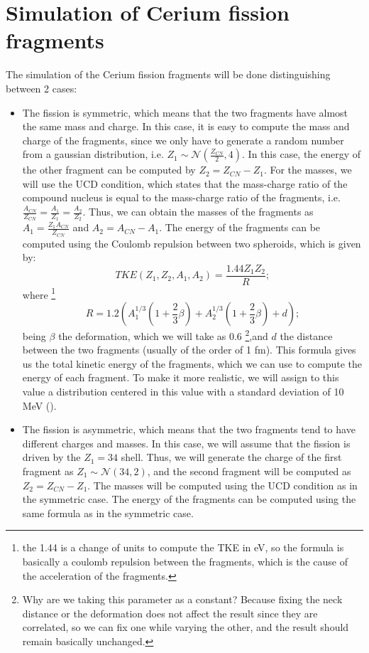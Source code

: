 \documentclass{article}
\begin{document}
\section{Simulation of Cerium fission fragments}
The simulation of the Cerium fission fragments will be done distinguishing between 2 cases:
\begin{itemize}
\item The fission is symmetric, which means that the two fragments have almost the same mass and charge. In this case, it is easy to compute the mass and charge of the fragments, since we only have to generate a random number from a gaussian distribution, i.e. $Z_1 \sim \mathcal{N}(\frac{Z_{CN}}{2},4)$.
In this case, the energy of the other fragment can be computed by $Z_2=Z_{CN}-Z_1$. For the masses, we will use the UCD condition, which states that the mass-charge ratio of the compound nucleus is equal to the mass-charge ratio of the fragments, i.e. $\frac{A_{CN}}{Z_{CN}}=\frac{A_1}{Z_1}=\frac{A_2}{Z_2}$.
Thus, we can obtain the masses of the fragments as $A_1=\frac{Z_1 A_{CN}}{Z_{CN}}$ and $A_2=A_{CN}-A_1$. The energy of the fragments can be computed using the Coulomb repulsion between two spheroids, which is given by:
\begin{equation}
TKE (Z_1, Z_2, A_1, A_2)= \frac{1.44 Z_1 Z_2}{R}; 
\end{equation}
where \footnote{the 1.44 is a change of units to compute the TKE in eV, so the formula is basically a coulomb repulsion between the fragments, which is the cause of the acceleration of the fragments.}
\begin{equation}
R=1.2 (A_1^{1/3}(1+\frac{2}{3} \beta)+A_2^{1/3}(1+\frac{2}{3} \beta)+d);
\end{equation}
being $\beta$ the deformation, which we will take as 0.6 \footnote{Why are we taking this parameter as a constant? Because fixing the neck distance or the deformation does not affect the result since they are correlated, so we can fix one while varying the other, and the result should remain basically unchanged.},and $d$ the distance between the two fragments (usually of the order of 1 fm).
This formula gives us the total kinetic energy of the fragments, which we can use to compute the energy of each fragment. To make it more realistic, we will assign to this value a distribution centered in this value with a standard deviation of 10 MeV (\cite{Wagemans}).

\item The fission is asymmetric, which means that the two fragments tend to have different charges and masses. In this case, we will assume that the fission is driven by the $Z_1=34$ shell. Thus, we will generate the charge of the first fragment as $Z_1 \sim \mathcal{N}(34,2)$, and the second fragment will be computed as $Z_2=Z_{CN}-Z_1$. The masses will be computed using the UCD condition as in the symmetric case. The energy of the fragments can be computed using the same formula as in the symmetric case.
\end{itemize}
\end{document}
